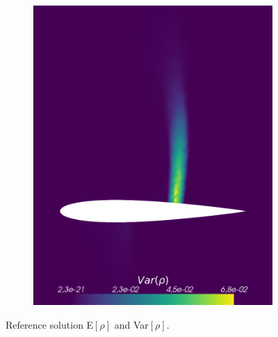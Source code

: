 \begin{figure}[h!]
\begin{subfigure}{0.5\linewidth}
				\includegraphics[scale=0.2]{figs/Euler1DPlots5/sc100_VarRho.png}
		\label{fig:referenceSolutionsub2}
	\end{subfigure}
	\caption{Reference solution E$[\rho]$ and Var$[\rho]$.}
	\label{fig:referenceSolution}
\end{figure}

